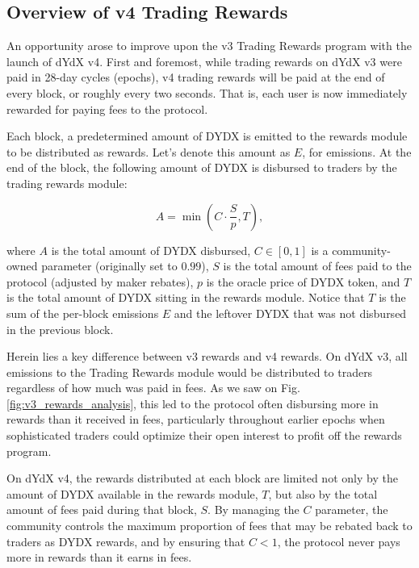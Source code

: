     \subsection{Overview of v4 Trading Rewards}
    
        An opportunity arose to improve upon the v3 Trading Rewards program with the launch of dYdX v4. First and foremost, while trading rewards on dYdX v3 were paid in 28-day cycles (epochs), v4 trading rewards will be paid at the end of every block, or roughly every two seconds. That is, each user is now immediately rewarded for paying fees to the protocol.

        Each block, a predetermined amount of DYDX is emitted to the rewards module to be distributed as rewards. Let's denote this amount as $E$, for emissions. At the end of the block, the following amount of DYDX is disbursed to traders by the trading rewards module:

        \begin{equation}
            A = \min{\left(C \cdot \frac{S}{p}, T\right)},
        \end{equation}

        where $A$ is the total amount of DYDX disbursed, $C \in [0, 1]$ is a community-owned parameter (originally set to $0.99$), $S$ is the total amount of fees paid to the protocol (adjusted by maker rebates), $p$ is the oracle price of DYDX token, and $T$ is the total amount of DYDX sitting in the rewards module. Notice that $T$ is the sum of the per-block emissions $E$ and the leftover DYDX that was not disbursed in the previous block.

        Herein lies a key difference between v3 rewards and v4 rewards. On dYdX v3, all emissions to the Trading Rewards module would be distributed to traders regardless of how much was paid in fees. As we saw on Fig. \ref{fig:v3_rewards_analysis}, this led to the protocol often disbursing more in rewards than it received in fees, particularly throughout earlier epochs when sophisticated traders could optimize their open interest to profit off the rewards program. 

        On dYdX v4, the rewards distributed at each block are limited not only by the amount of DYDX available in the rewards module, $T$, but also by the total amount of fees paid during that block, $S$. By managing the $C$ parameter, the community controls the maximum proportion of fees that may be rebated back to traders as DYDX rewards, and by ensuring that $C < 1$, the protocol never pays more in rewards than it earns in fees. 

